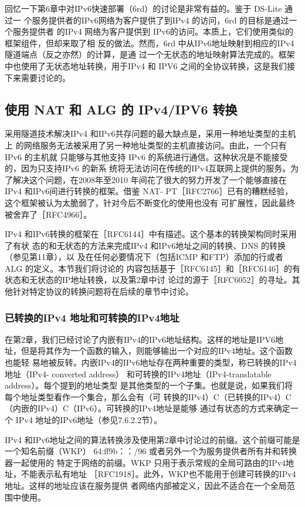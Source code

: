 回忆一下第6章中对IPv6快速部署（6rd）的讨论是非常有益的。鉴于 DS-Lite 通过一
个服务提供者的IPv6网络为客户提供了到IPv4 的访问，6rd 的目标是通过一个服务提供者
的IPv4 网络为客户提供到 IPv6的访问。本质上，它们使用类似的框架组件，但却来取了相
反的做法。然而，6rd 中从IPv6地址映射到相应的IPv4 隧道端点（反之亦然）的计算，是通
过一个无状态的地址映射算法完成的。框架中也使用了无状态地址转换，用于IPv4 和 IPV6
之间的全协议转换，这是我们接下来需要讨论的。

\subsection{使用 NAT 和 ALG 的 IPv4/IPV6 转换}

采用隧道技术解决IPv4 和IPv6共存问题的最大缺点是，采用一种地址类型的主机上
的网络服务无法被采用了另一种地址类型的主机直接访问。由此，一个只有IPv6 的主机就
只能够与其他支持 IPv6 的系统进行通信。这种状况是不能接受的，因为只支持IPv6 的新系
统将无法访问在传统的IPv4互联网上提供的服务。为了解决这个问题，在2008年至2010
年间花了很大的努力开发了一个能够直接在IPv4 和IPv6间进行转换的框架。借鉴 NAT-
PT［RFC2766］已有的糟糕经验，这个框架被认为太脆弱了，针对今后不断变化的使用也没有
可扩展性，因此最终被舍弃了［RFC4966］。

IPv4 和IPv6转换的框架在［RFC6144］中有描述。这个基本的转换架构同时采用了有状
态的和无状态的方法来完成IPv4 和IPv6地址之间的转换、DNS 的转换（参见第11章），以
及在任何必要情况下（包括ICMP 和FTP）添加的行或者ALG 的定义。本节我们将讨论的
内容包括基于［RFC6145］和［RFC6146］的有状态和无状态的IP地址转换，以及第2章中讨
论过的源于［RFC6052］的寻址。其他针对特定协议的转换问题将在后续的章节中讨论。

\subsubsection{已转换的IPv4 地址和可转换的IPv4地址}

在第2章，我们已经讨论了内嵌有IPv4的IPv6地址结构。这样的地址是IPV6地
址，但是将其作为一个函数的输入，则能够输出一个对应的IPv4地址。这个函数也能轻
易地被反转。内嵌IPv4的IPv6地址存在两种重要的类型，称已转换的IPv4地址（IPv4-
converted address） 和可转换的IPv4地址（IPv4-translatable address）。每个提到的地址类型
是其他类型的一个子集。也就是说，如果我们将每个地址类型看作一个集合，那么会有（可
转换的IPv4）C（已转换的IPv4）C（内嵌的IPv4）C（IPv6）。可转换的IPv4地址是能够
通过有状态的方式来确定一个 IPv4 地址的IPv6地址（参见7.6.2.2节）。

IPv4 和IPv6地址之间的算法转换涉及使用第2章中讨论过的前缀。这个前缀可能是
一个知名前缀（WKP） 64:ff9b：：/96 或者另外一个为服务提供者所有并和转换器一起使用的
特定于网络的前缀。WKP 只用于表示常规的全局可路由的IPv4地址，不能表示私有地址
［RFC1918］。此外，WKP也不能用于创建可转换的IPv4地址。这样的地址应该在服务提供
者网络内部被定义，因此不适合在一个全局范围中使用。


